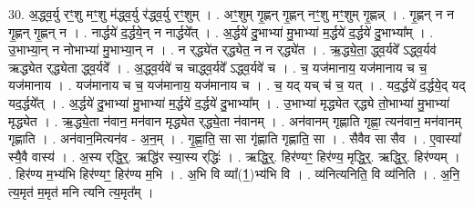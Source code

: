 \documentclass[17pt]{extarticle}
\begin{document}
30. अ॒द्ध्व॒र्यु रꣳ॒॒शु मꣳ॒॒शु म॑द्ध्व॒र्यु र॑द्ध्व॒र्यु रꣳ॒॒शुम् । . अꣳ॒॒शुम् गृ॒ह्णन् गृ॒ह्णन् नꣳ॒॒शु मꣳ॒॒शुम् गृ॒ह्णन्न् । . गृ॒ह्णन् न न गृ॒ह्णन् गृ॒ह्णन् न । . नार्द्धये॑ द॒र्द्धये॒न् न नार्द्धये᳚त् । . अ॒र्द्धये॑ दु॒भाभ्या॑ मु॒भाभ्या॑ म॒र्द्धये॑ द॒र्द्धये॑ दु॒भाभ्या᳚म् । . उ॒भाभ्या॒न् न नोभाभ्या॑ मु॒भाभ्या॒न् न । . न र्‌द्ध्ये॑त र्‌द्ध्येत॒ न न र्‌द्ध्ये॑त । . ऋ॒द्ध्ये॒ता॒ द्ध्व॒र्यवे᳚ ऽद्ध्व॒र्यव॑ ऋद्ध्येत र्‌द्ध्येता द्ध्व॒र्यवे᳚ । . अ॒द्ध्व॒र्यवे॑ च चाद्ध्व॒र्यवे᳚ ऽद्ध्व॒र्यवे॑ च । . च॒ यज॑मानाय॒ यज॑मानाय च च॒ यज॑मानाय । . यज॑मानाय च च॒ यज॑मानाय॒ यज॑मानाय च । . च॒ यद् यच् च॑ च॒ यत् । . यद॒र्द्धये॑ द॒र्द्धये॒द् यद् यद॒र्द्धये᳚त् । . अ॒र्द्धये॑ दु॒भाभ्या॑ मु॒भाभ्या॑ म॒र्द्धये॑ द॒र्द्धये॑ दु॒भाभ्या᳚म् । . उ॒भाभ्या॑ मृद्ध्येत र्‌द्ध्ये तो॒भाभ्या॑ मु॒भाभ्या॑ मृद्ध्येत । . ऋ॒द्ध्ये॒ता न॑वान॒ मन॑वान मृद्ध्येत र्‌द्ध्ये॒ता न॑वानम् । . अन॑वानम् गृह्णाति गृह्णा॒ त्यन॑वान॒ मन॑वानम् गृह्णाति । . अन॑वान॒मित्यन॑व - अ॒न॒म् । . गृ॒ह्णा॒ति॒ सा सा गृ॑ह्णाति गृह्णाति॒ सा । . सैवैव सा सैव । . ए॒वास्या᳚ स्यै॒वै वास्य॑ । . अ॒स्य र्‌द्धि॒र्॒. ऋद्धि॑र स्या॒स्य र्‌द्धिः॑ । . ऋद्धि॒र्॒. हिर॑ण्यꣳ॒॒ हिर॑ण्य॒ मृद्धि॒र्॒. ऋद्धि॒र्॒. हिर॑ण्यम् । . हिर॑ण्य म॒भ्य॑भि हिर॑ण्यꣳ॒॒ हिर॑ण्य म॒भि । . अ॒भि वि व्या᳚(1॒)भ्य॑भि वि । . व्य॑नित्यनिति॒ वि व्य॑निति । . अ॒नि॒ त्य॒मृत॑ म॒मृत॑ मनि त्यनि त्य॒मृत᳚म् । \newline
\end{document}
